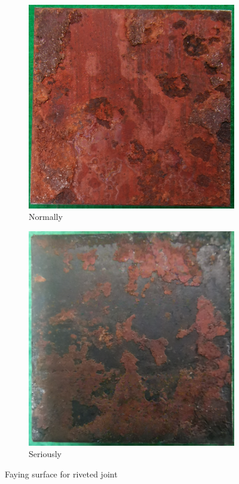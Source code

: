 \begin{figure}
    \centering
    \begin{subfigure}[t]{0.4\textwidth}
    \includegraphics[width=\linewidth]{imgs/ch3/fig2a.png}
    \caption{Normally}
    \label{ch3fig2a}  
    \end{subfigure}
    \hfill
    \begin{subfigure}[t]{0.4\textwidth}
    \includegraphics[width=\linewidth]{imgs/ch3/fig2b.png}
    \caption{Seriously}
    \label{ch3fig2b}  
    \end{subfigure}
    \caption{Faying surface for riveted joint}
\end{figure}

